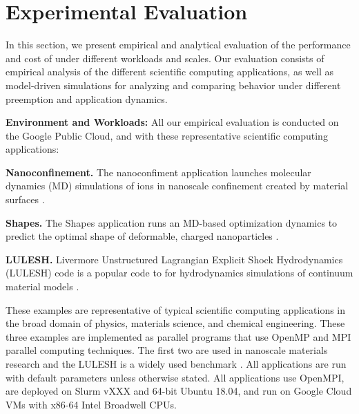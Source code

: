 \vspace*{\subsecspace}
\section{Experimental Evaluation}
\label{sec:eval}

In this section, we present empirical and analytical evaluation of the performance and cost of \sysname under different workloads and scales. 
Our evaluation consists of empirical analysis of the different scientific computing applications, as well as model-driven simulations for analyzing and comparing \sysname behavior under different preemption and application dynamics. 


\noindent \textbf{Environment and Workloads:} All our empirical evaluation is conducted on the Google Public Cloud, and with these representative scientific computing applications: 

\noindent \textbf{Nanoconfinement.}
The nanoconfiment application launches molecular dynamics (MD) simulations of ions in nanoscale confinement created by material surfaces \cite{jyto,kadupitiya2017}.

\noindent \textbf{Shapes.} The Shapes application runs an MD-based optimization dynamics to predict the optimal shape of deformable, charged nanoparticles \cite{jto1,jjzo1}. 

\noindent \textbf{LULESH.} Livermore Unstructured Lagrangian Explicit Shock Hydrodynamics (LULESH) code is a popular code to for hydrodynamics simulations of continuum material models \cite{IPDPS13:LULESH,LULESH2:changes}. 

These examples are representative of typical scientific computing applications in the broad domain of physics, materials science, and chemical engineering. These three examples are implemented as parallel programs that use OpenMP and MPI parallel computing techniques. The first two are used in nanoscale materials research \cite{jso1,jso2,solis2013generating,jjzo1,jto1,jyto} and the LULESH is a widely used benchmark \cite{IPDPS13:LULESH,LULESH2:changes}. All applications are run with default parameters unless otherwise stated. 
All applications use OpenMPI, are deployed on Slurm vXXX and 64-bit Ubuntu 18.04, and run on Google Cloud VMs with x86-64 Intel Broadwell CPUs. 


